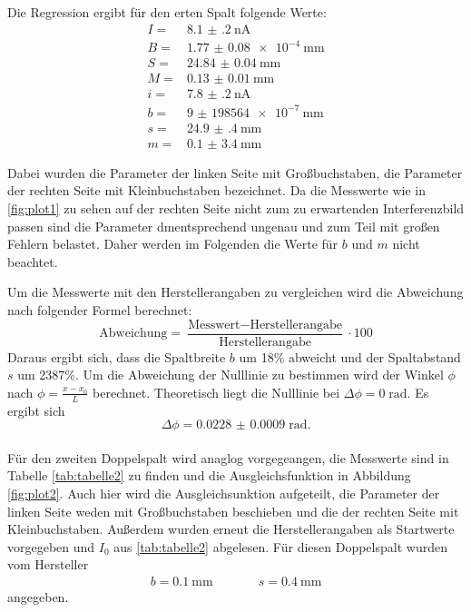 Die Regression ergibt für den erten Spalt folgende Werte:
\begin{align*}
  I =& \SI{8.1(2)}{\nA}\\
  B =& \SI{1.77(8)e-4}{\mm}\\
  S =& \SI{24.84(4)}{\mm}\\
  M =& \SI{0.13(1)}{\mm}\\
  i =& \SI{7.8(2)}{\nA}\\
  b =& \SI{9(198564)e-7}{\mm}\\
  s =& \SI{24.9(4)}{\mm}\\
  m =& \SI{0.1(34)}{\mm}
\end{align*}

Dabei wurden die Parameter der linken Seite mit Großbuchstaben, die Parameter der rechten Seite
mit Kleinbuchstaben bezeichnet. Da die Messwerte wie in \ref{fig:plot1} zu sehen auf der rechten
Seite nicht zum zu erwartenden Interferenzbild passen sind die Parameter dmentsprechend ungenau und
zum Teil mit großen Fehlern belastet. Daher werden im Folgenden die Werte für
$b$ und $m$ nicht beachtet.

Um die Messwerte mit den Herstellerangaben zu vergleichen wird die Abweichung nach folgender
Formel berechnet:
\begin{equation}
  \text{Abweichung}=\frac{\text{Messwert}-\text{Herstellerangabe}}{\text{Herstellerangabe}}\cdot100
\end{equation}
Daraus ergibt sich, dass die Spaltbreite $b$ um 18\% abweicht
und der Spaltabstand $s$ um 2387\%.
Um die Abweichung der Nulllinie zu bestimmen wird
der Winkel $\phi$ nach $\phi=\frac{x-x_{0}}{L}$ berechnet. Theoretisch liegt die
Nulllinie bei $\Delta \phi=0\;\text{rad} $. Es ergibt sich
\begin{equation*}
  \Delta \phi =\SI{0.0228(9)}\; \text{rad}.
\end{equation*}\\

Für den zweiten Doppelspalt wird anaglog vorgegeangen, die Messwerte sind in Tabelle
\ref{tab:tabelle2} zu finden und die Ausgleichsfunktion in Abbildung \ref{fig:plot2}.
Auch hier wird die Ausgleichsunktion aufgeteilt, die Parameter der linken Seite weden mit
Großbuchstaben beschieben und die der rechten Seite mit Kleinbuchstaben. Außerdem wurden erneut die Herstellerangaben
als Startwerte vorgegeben und $I_0$ aus \ref{tab:tabelle2} abgelesen.
Für diesen Doppelspalt wurden vom Hersteller
\begin{align*}
  b=\SI{0,1}{\mm}  &\;\;\;\;\;\;\;\;\;\; s=\SI{0,4}{\mm}
\end{align*}
angegeben.

